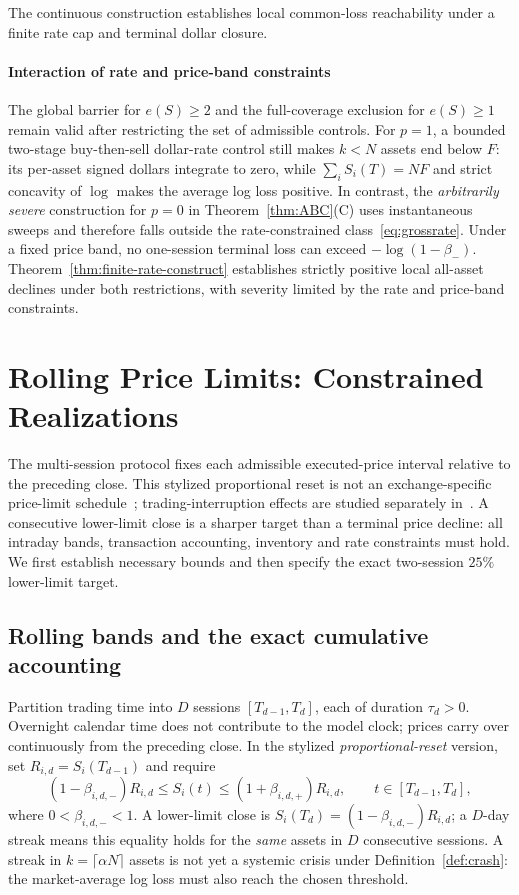 \documentclass[review,hidelinks,onefignum,onetabnum]{siamonline250211}
\begin{document}
The continuous construction establishes local common-loss reachability under a finite rate cap and terminal dollar closure.

\paragraph{Interaction of rate and price-band constraints}
The global barrier for $e(S)\ge2$ and the full-coverage exclusion for $e(S)\ge1$ remain valid after restricting the set of admissible controls. For $p=1$, a bounded two-stage buy-then-sell dollar-rate control still makes $k<N$ assets end below $F$: its per-asset signed dollars integrate to zero, while $\sum_i S_i(T)=NF$ and strict concavity of $\log$ makes the average log loss positive. In contrast, the \emph{arbitrarily severe} construction for $p=0$ in Theorem~\ref{thm:ABC}(C) uses instantaneous sweeps and therefore falls outside the rate-constrained class~\eqref{eq:grossrate}. Under a fixed price band, no one-session terminal loss can exceed $-\log(1-\beta_-)$. Theorem~\ref{thm:finite-rate-construct} establishes strictly positive local all-asset declines under both restrictions, with severity limited by the rate and price-band constraints.



\section{Rolling Price Limits: Constrained Realizations}\label{sec:multiday}
The multi-session protocol fixes each admissible executed-price interval relative to the preceding close. This stylized proportional reset is not an exchange-specific price-limit schedule~\citep{JPX2026,KimRhee1997,Chen2019}; trading-interruption effects are studied separately in~\citep{Subrahmanyam1994}. A consecutive lower-limit close is a sharper target than a terminal price decline: all intraday bands, transaction accounting, inventory and rate constraints must hold. We first establish necessary bounds and then specify the exact two-session $25\%$ lower-limit target.

\subsection{Rolling bands and the exact cumulative accounting}\label{subsec:multiday-protocol}
Partition trading time into $D$ sessions $[T_{d-1},T_d]$, each of duration $\tau_d>0$. Overnight calendar time does not contribute to the model clock; prices carry over continuously from the preceding close. In the stylized \emph{proportional-reset} version, set $R_{i,d}=S_i(T_{d-1})$ and require
\begin{equation}\label{eq:rolling-band}
 (1-\beta_{i,d,-})R_{i,d}\le S_i(t)\le(1+\beta_{i,d,+})R_{i,d},
 \qquad t\in[T_{d-1},T_d],
\end{equation}
where $0<\beta_{i,d,-}<1$. A lower-limit close is
$S_i(T_d)=(1-\beta_{i,d,-})R_{i,d}$; a $D$-day streak means this equality holds for the \emph{same} assets in $D$ consecutive sessions. A streak in $k=\lceil\alpha N\rceil$ assets is not yet a systemic crisis under Definition~\ref{def:crash}: the market-average log loss must also reach the chosen threshold.
\end{document}
